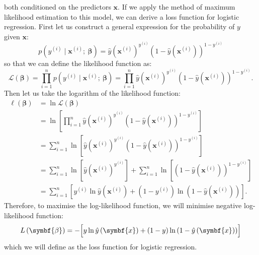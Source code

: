 \documentclass{article}
\begin{document}
both conditioned on the predictors \(\symbf{x}\).
If we apply the method of maximum likelihood estimation to this model,
we can derive a loss function for logistic regression. First let us
construct a general expression for the probability of \(y\) given
\(\symbf{x}\):
\begin{equation*}
    p\left( y^{\left( i \right)} \mid \symbf{x}^{\left( i \right)};\: \symbf{\beta} \right) = \hat{y}{\left( \symbf{x}^{\left( i \right)} \right)}^{y^{\left( i \right)}} {\left( 1 - \hat{y}\left( \symbf{x}^{\left( i \right)} \right) \right)}^{1 - y^{\left( i \right)}}
\end{equation*}
so that we can define the likelihood function as:
\begin{equation*}
    \mathcal{L}\left( \symbf{\beta} \right) = \prod_{i = 1}^n p\left( y^{\left( i \right)} \mid \symbf{x}^{\left( i \right)};\: \symbf{\beta} \right) = \prod_{i = 1}^n \hat{y}{\left( \symbf{x}^{\left( i \right)} \right)}^{y^{\left( i \right)}} {\left( 1 - \hat{y}\left( \symbf{x}^{\left( i \right)} \right) \right)}^{1 - y^{\left( i \right)}}.
\end{equation*}
Then let us take the logarithm of the likelihood function:
\begin{align*}
    \ell\left( \symbf{\beta} \right) & = \ln{\mathcal{L}\left( \symbf{\beta} \right)}                                                                                                                                                                                                           \\
                                     & = \ln{\left[ \prod_{i = 1}^n \hat{y}{\left( \symbf{x}^{\left( i \right)} \right)}^{y^{\left( i \right)}} {\left( 1 - \hat{y}\left( \symbf{x}^{\left( i \right)} \right) \right)}^{1 - y^{\left( i \right)}} \right]}                                     \\
                                     & = \sum_{i = 1}^n \ln{\left[ \hat{y}{\left( \symbf{x}^{\left( i \right)} \right)}^{y^{\left( i \right)}} {\left( 1 - \hat{y}\left( \symbf{x}^{\left( i \right)} \right) \right)}^{1 - y^{\left( i \right)}} \right]}                                      \\
                                     & = \sum_{i = 1}^n \ln{\left[ \hat{y}{\left( \symbf{x}^{\left( i \right)} \right)}^{y^{\left( i \right)}} \right]} + \sum_{i = 1}^n \ln{\left[ {\left( 1 - \hat{y}\left( \symbf{x}^{\left( i \right)} \right) \right)}^{1 - y^{\left( i \right)}} \right]} \\
                                     & = \sum_{i = 1}^n \left[ y^{\left( i \right)} \ln{\hat{y}\left( \symbf{x}^{\left( i \right)} \right)} + \left( 1 - y^{\left( i \right)} \right) \ln{\left( 1 - \hat{y}\left( \symbf{x}^{\left( i \right)} \right) \right)} \right].
\end{align*}
Therefore, to maximise the log-likelihood function, we will minimise
negative log-likelihood function:
\begin{equation*}
    L\left( \symbf{\beta} \right) = -\Bigl[ y \ln{\hat{y}\left( \symbf{x} \right)} + \left( 1 - y \right) \ln{\left( 1 - \hat{y}\left( \symbf{x} \right) \right)} \Bigr]
\end{equation*}
which we will define as the loss function for logistic regression.
\end{document}
